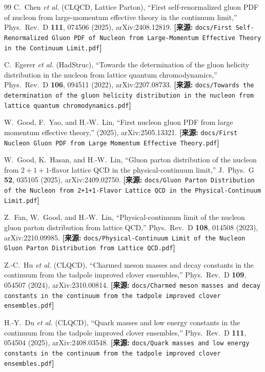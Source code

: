\documentclass[12pt,a4paper]{ctexart}
\theoremstyle{definition}
\begin{document}
\begin{thebibliography}{99}
C.~Chen \textit{et al.} (CLQCD, Lattice Parton),
``First self-renormalized gluon PDF of nucleon from large-momentum effective theory in the continuum limit,''
Phys.\ Rev.\ D \textbf{111}, 074506 (2025), arXiv:2408.12819.
\quad\textbf{[来源:} \texttt{docs/First Self-Renormalized Gluon PDF of Nucleon from Large-Momentum Effective Theory in the Continuum Limit.pdf}\textbf{]}

C.~Egerer \textit{et al.} (HadStruc),
``Towards the determination of the gluon helicity distribution in the nucleon from lattice quantum chromodynamics,''
Phys.\ Rev.\ D \textbf{106}, 094511 (2022), arXiv:2207.08733.
\quad\textbf{[来源:} \texttt{docs/Towards the determination of the gluon helicity distribution in the nucleon from lattice quantum chromodynamics.pdf}\textbf{]}

W.~Good, F.~Yao, and H.-W.~Lin,
``First nucleon gluon PDF from large momentum effective theory,''
(2025), arXiv:2505.13321.
\quad\textbf{[来源:} \texttt{docs/First Nucleon Gluon PDF from Large Momentum Effective Theory.pdf}\textbf{]}

W.~Good, K.~Hasan, and H.-W.~Lin,
``Gluon parton distribution of the nucleon from $2+1+1$-flavor lattice QCD in the physical-continuum limit,''
J.\ Phys.\ G \textbf{52}, 035105 (2025), arXiv:2409.02750.
\quad\textbf{[来源:} \texttt{docs/Gluon Parton Distribution of the Nucleon from 2+1+1-Flavor Lattice QCD in the Physical-Continuum Limit.pdf}\textbf{]}

Z.~Fan, W.~Good, and H.-W.~Lin,
``Physical-continuum limit of the nucleon gluon parton distribution from lattice QCD,''
Phys.\ Rev.\ D \textbf{108}, 014508 (2023), arXiv:2210.09985.
\quad\textbf{[来源:} \texttt{docs/Physical-Continuum Limit of the Nucleon Gluon Parton Distribution from Lattice QCD.pdf}\textbf{]}

Z.-C.~Hu \textit{et al.} (CLQCD),
``Charmed meson masses and decay constants in the continuum from the tadpole improved clover ensembles,''
Phys.\ Rev.\ D \textbf{109}, 054507 (2024), arXiv:2310.00814.
\quad\textbf{[来源:} \texttt{docs/Charmed meson masses and decay constants in the continuum from the tadpole improved clover ensembles.pdf}\textbf{]}

H.-Y.~Du \textit{et al.} (CLQCD),
``Quark masses and low energy constants in the continuum from the tadpole improved clover ensembles,''
Phys.\ Rev.\ D \textbf{111}, 054504 (2025), arXiv:2408.03548.
\quad\textbf{[来源:} \texttt{docs/Quark masses and low energy constants in the continuum from the tadpole improved clover ensembles.pdf}\textbf{]}


\end{thebibliography}
\end{document}
